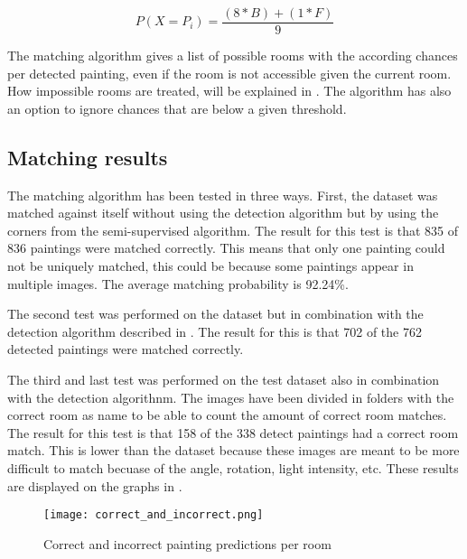\begin{equation}
    \label{eq:histogram-score}
    P(X = P_{i}) = \frac{(8 * B) + (1 * F)}{9}
\end{equation}

The matching algorithm gives a list of possible rooms with the according chances per detected painting, even if the room is not accessible given the current room. How impossible rooms are treated, will be explained in . The algorithm has also an option to ignore chances that are below a given threshold.

\subsection{Matching results}
The matching algorithm has been tested in three ways. First, the dataset was matched against itself without using the detection algorithm but by using the corners from the semi-supervised algorithm. The result for this test is that 835 of 836 paintings were matched correctly. This means that only one painting could not be uniquely matched, this could be because some paintings appear in multiple images. The average matching probability is 92.24\%.

The second test was performed on the dataset but in combination with the detection algorithm described in . The result for this is that 702 of the 762 detected paintings were matched correctly.

The third and last test was performed on the test dataset also in combination with the detection algorithnm. The images have been divided in folders with the correct room as name to be able to count the amount of correct room matches. The result for this test is that 158 of the 338 detect paintings had a correct room match. This is lower than the dataset because these images are meant to be more difficult to match becuase of the angle, rotation, light intensity, etc. These results are displayed on the graphs in .

\begin{figure}
    \centering
    \texttt{[image: correct\_and\_incorrect.png]}

    \caption{Correct and incorrect painting predictions per room}
    \label{fig:correct-incorrect-paintings}
\end{figure}

